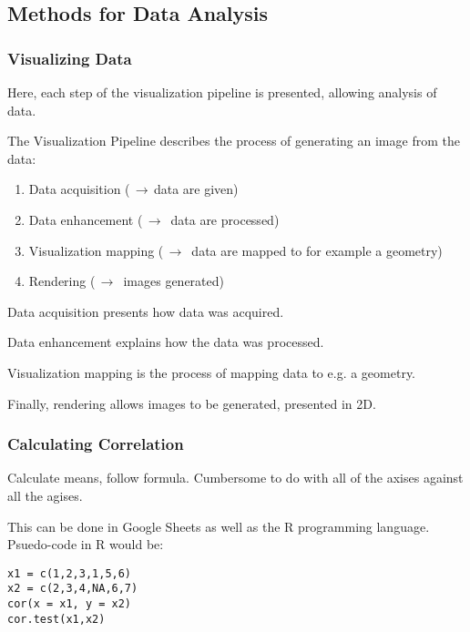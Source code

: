 \subsection{Methods for Data Analysis}

\subsubsection{Visualizing Data}

Here, each step of the visualization pipeline is presented, allowing analysis of data.

The Visualization Pipeline describes the process of generating an image from the data: \cite{timo-ropinski-liu}

\begin{enumerate}
\item Data acquisition ($\,\to\,$data are given)
\item Data enhancement ($\,\to\,$ data are processed)
\item Visualization mapping ($\,\to\,$ data are mapped to for example a geometry)
\item Rendering ($\,\to\,$ images generated)
\end{enumerate}


Data acquisition presents how data was acquired.

Data enhancement explains how the data was processed.

Visualization mapping is the process of mapping data to e.g. a geometry.

Finally, rendering allows images to be generated, presented in 2D.

\subsubsection{Calculating Correlation}

Calculate means, follow formula. Cumbersome to do with all of the axises against all the agises.

This can be done in Google Sheets as well as the R programming language. Psuedo-code in R would be:

\begin{verbatim}
x1 = c(1,2,3,1,5,6)
x2 = c(2,3,4,NA,6,7)
cor(x = x1, y = x2)
cor.test(x1,x2)
\end{verbatim}

